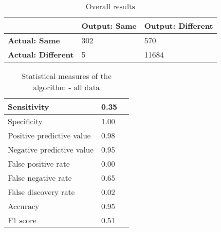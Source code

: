 \begin{table}[H]
    \begin{spacing}{1.5}
    \centering
    \begin{tabular}{|l|l|l|}
        \hline
        \cellcolor{gray} & \textbf{Output: Same} & \textbf{Output: Different} \\ [0.5ex]
        \hline\hline
        \textbf{Actual: Same} & 302 & 570 \\ [0.5ex]
        \hline
        \textbf{Actual: Different} & 5 & 11684 \\ [0.5ex]
        \hline
    \end{tabular}
    \caption{Overall results}
    \label{tab:overall_results}
    \end{spacing}
\end{table}
        
\begin{table}[H]
    \centering
    \begin{spacing}{1.5}
    \begin{tabular}{|l|l|l|}
        \hline
        Sensitivity                 & 0.35 \\
        \hline
        Specificity                 & 1.00 \\
        \hline
        Positive predictive value   & 0.98 \\
        \hline
        Negative predictive value   & 0.95 \\
        \hline
        False positive rate         & 0.00 \\
        \hline
        False negative rate         & 0.65 \\
        \hline
        False discovery rate        & 0.02 \\
        \hline
        Accuracy                    & 0.95 \\
        \hline
        F1 score                    & 0.51 \\
        \hline
    \end{tabular}
    \end{spacing}
    \caption{Statistical measures of the algorithm - all data}
\end{table}

